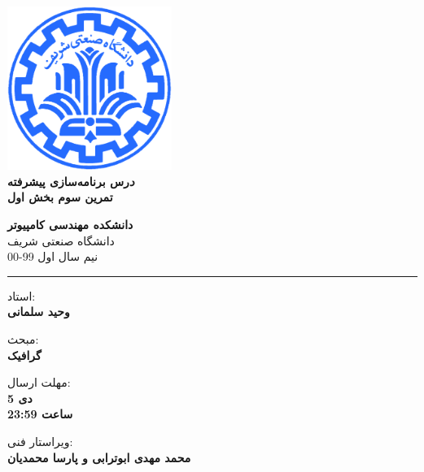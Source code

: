\documentclass[]{article}
\begin{document}
\begin{titlepage}
\begin{center}
        
\vspace*{0.7cm}

\includegraphics[width=0.4\textwidth]{sharif1.png}\\
\vspace{0.5cm}
\textbf{ \Huge{\emph درس برنامه‌سازی پیشرفته} }\\
\vspace{0.5cm}
\textbf{ \Large{ تمرین سوم بخش اول} }
\vspace{0.2cm}
       
 
      \large \textbf{دانشکده مهندسی کامپیوتر}\\\vspace{0.2cm}
    \large   دانشگاه صنعتی شریف\\\vspace{0.2cm}
       \large   ﻧﯿﻢ سال اول 99-00 \\\vspace{0.2cm}
      \noindent\rule[1ex]{\linewidth}{1pt}
   
   استاد:\\
   \textbf{{وحید سلمانی}}
   
       \vspace{0.20cm}
    مبحث:\\
    \textbf{{گرافیک}}

    \vspace{0.20cm}

   مهلت ارسال:\\
    \textbf{{5 دی}}\\
    \textbf{{ساعت 23:59}}

    \vspace{0.15cm}
ویراستار فنی:\\
    \textbf{{محمد مهدی ابوترابی و پارسا محمدیان}}
\end{center}
\end{titlepage}
\end{document}
